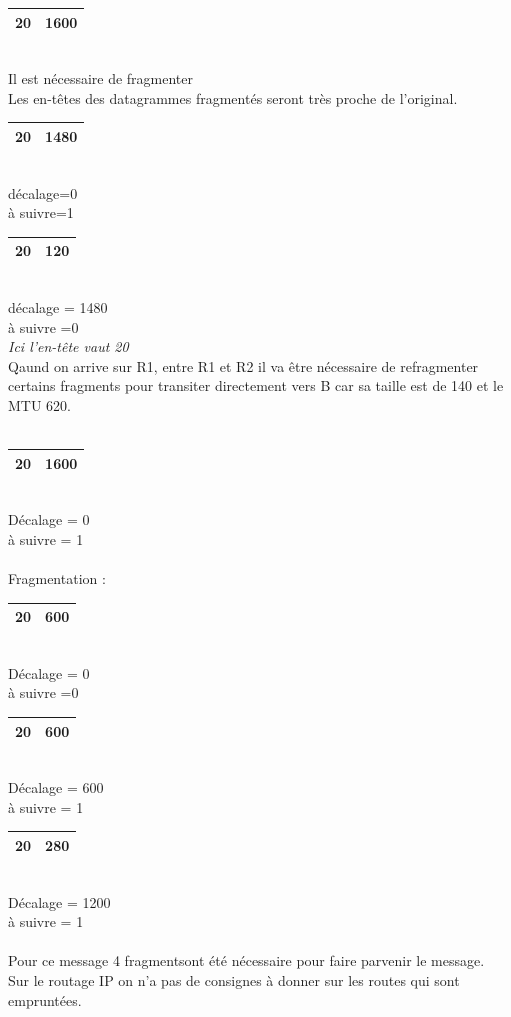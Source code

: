 \documentclass{article}
\begin{document}
\begin{tabular}{|c|c|} 
\hline 
20 & 1600 \\ 
\hline 
\end{tabular}
\\ Il est nécessaire de fragmenter \\
Les en-têtes des datagrammes fragmentés seront très proche de l'original. \\
\begin{tabular}{|c|c|}
\hline 
20 & 1480 \\ 
\hline 
\end{tabular} \\
décalage=0 \\
à suivre=1 \\
\begin{tabular}{|c|c|}
\hline 
20 & 120 \\ 
\hline 
\end{tabular} \\
décalage = 1480 \\
à suivre =0 \\
\textit{Ici l'en-tête vaut 20} \\
Qaund on arrive sur R1, entre R1 et R2 il va être nécessaire de refragmenter certains fragments pour transiter directement vers B car sa taille est de 140 et le MTU 620. \\
\\
\begin{tabular}{|c|c|}
\hline 
20 & 1600 \\ 
\hline 
\end{tabular} \\
Décalage = 0 \\
à suivre = 1 \\
\\
Fragmentation : \\
\begin{tabular}{|c|c|}
\hline 
20 & 600 \\ 
\hline 
\end{tabular} \\
Décalage = 0 \\
à suivre =0 \\
\begin{tabular}{|c|c|}
\hline 
20 & 600 \\ 
\hline 
\end{tabular}  \\
Décalage = 600 \\
à suivre = 1 \\
\begin{tabular}{|c|c|}
\hline 
20 & 280 \\ 
\hline 
\end{tabular} \\
Décalage = 1200 \\
à suivre = 1 \\
\\
Pour ce message 4 fragmentsont été nécessaire pour faire parvenir le message. \\
Sur le routage IP on n'a pas de consignes à donner sur les routes qui sont empruntées. \\
\newpage
\end{document}
